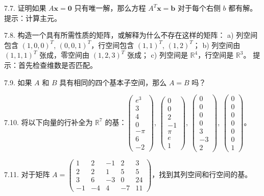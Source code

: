 7.7. 证明如果 $A \mathbf{x} = \mathbf{0}$ 只有唯一解，那么方程 $A^T \mathbf{x} = \mathbf{b}$ 对于每个右侧 $b$ 都有解。提示：计算主元。

7.8. 构造一个具有所需性质的矩阵，或解释为什么不存在这样的矩阵：
a) 列空间包含 $(1, 0, 0)^T$, $(0, 0, 1)^T$，行空间包含 $(1, 1)^T$, $(1, 2)^T$；
b) 列空间由 $(1, 1, 1)^T$ 张成，零空间由 $(1, 2, 3)^T$ 张成；
c) 列空间是 $\mathbb{R}^4$，行空间是 $\mathbb{R}^3$。
提示：首先检查维数是否匹配。

7.9. 如果 $A$ 和 $B$ 具有相同的四个基本子空间，那么 $A = B$ 吗？

7.10. 将以下向量的行补全为 $\mathbb{R}^7$ 的基：$\begin{pmatrix} e^3 \\ 3 \\ 4 \\ 0 \\ -\pi \\ 6 \\ -2 \end{pmatrix}$, $\begin{pmatrix} 0 \\ 0 \\ 2 \\ -1 \\ \pi \\ e \\ 1 \end{pmatrix}$, $\begin{pmatrix} 0 \\ 0 \\ 0 \\ 0 \\ 3 \\ -3 \\ 2 \end{pmatrix}$, $\begin{pmatrix} 0 \\ 0 \\ 0 \\ 0 \\ 0 \\ 0 \\ 1 \end{pmatrix}$。

7.11. 对于矩阵 $A = \begin{pmatrix} 1 & 2 & -1 & 2 & 3 \\ 2 & 2 & 1 & 5 & 5 \\ 3 & 6 & -3 & 0 & 24 \\ -1 & -4 & 4 & -7 & 11 \end{pmatrix}$，找到其列空间和行空间的基。

